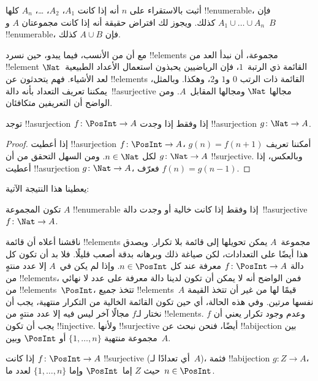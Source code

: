 \documentclass[../../../include/open-logic-section]{subfiles}
\begin{document}
\begin{prob}
  أثبت بالاستقراء على $n$ أنه إذا كانت $A_1$، $A_2$، \dots، $A_n$
  كلها !!{enumerable}، فإن $A_1 \cup \dots \cup A_n$ كذلك. ويجوز لك
  افتراض حقيقة أنه إذا كانت مجموعتان $A$ و~$B$ !!{enumerable}، فإن $A \cup
  B$ كذلك.
\end{prob}

مع أن من الأنسب، فيما يبدو، حين نسرد !!{element}s مجموعة، أن نبدأ
العد من !!{element} القائمة ذي الرتبة~$1$، فإن الرياضيين يحبذون استعمال
الأعداد الطبيعية~$\Nat$ لعد الأشياء. فهم يتحدثون عن !!{element}s
القائمة ذات الرتب $0$ و$1$ و$2$، وهكذا. وبالمثل، يمكننا تعريف
التعداد بأنه دالة~!!a{surjective} مجالها $\Nat$ ومجالها المقابل~$A$.
ومن الواضح أن التعريفين متكافئان.

\begin{prop}
  توجد !!a{surjection} $f\colon \PosInt \to A$ إذا وفقط إذا وجدت
  !!a{surjection} $g\colon \Nat \to A$.
\end{prop}

\begin{proof}
  إذا أعطيت !!a{surjection} $f\colon \PosInt \to A$، أمكننا تعريف $g(n) =
  f(n+1)$ لكل $n \in \Nat$. ومن السهل التحقق من أن $g\colon \Nat
  \to A$ !!{surjective}. وبالعكس، إذا أعطيت !!a{surjection} $g\colon
  \Nat \to A$، فعرّف $f(n) = g(n-1)$.
\end{proof}

يعطينا هذا النتيجة الآتية:

\begin{cor}
تكون المجموعة $A$ !!{enumerable} إذا وفقط إذا كانت خالية أو وجدت
دالة~!!a{surjective} $f\colon \Nat \to A$.
\end{cor}

ناقشنا أعلاه أن قائمة !!{element}s مجموعة~$A$ يمكن تحويلها إلى قائمة
بلا تكرار. ويصدق هذا أيضًا على التعدادات، لكن صياغة ذلك وبرهانه بدقة
أصعب قليلًا. فلا بد أن تكون كل دالة $f\colon \PosInt \to A$
معرفة عند كل $n \in
\PosInt$. وإذا لم يكن في~$A$ إلا عدد
منتهٍ من !!{element}s، فمن الواضح أنه لا يمكن أن تكون لدينا دالة معرفة
على عدد لا نهائي من !!{element}s~$\PosInt$، تتخذ جميع !!{element}s~$A$
قيمًا لها من غير أن تتخذ القيمة نفسها مرتين. وفي هذه الحالة، أي حين
تكون القائمة الخالية من التكرار منتهية، يجب أن نختار لـ$f$ مجالًا
آخر ليس فيه إلا عدد منتهٍ من !!{element}s. وعدم وجود تكرار يعني أن
$f$ يجب أن تكون !!{injective}. ولأنها !!{surjective} أيضًا، فنحن
نبحث عن !!a{bijection} بين مجموعة منتهية $\{1, \dots, n\}$ أو
$\PosInt$ وبين~$A$.

\begin{prop}
إذا كانت $f\colon \PosInt \to A$ !!{surjective} (أي تعدادًا
لـ~$A$)، فثمة !!a{bijection} $g\colon Z \to A$، حيث $Z$
إما~$\PosInt$ وإما $\{1, \dots, n\}$ لعدد ما~$n \in \PosInt$.
\end{prop}
\end{document}
